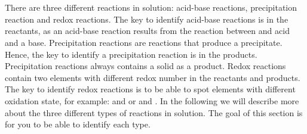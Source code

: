 \documentclass[main.tex]{subfiles}
\begin{document}
\section{\color{blue!30!black}{An introduction to reactions in solution}}
There are three different reactions in solution: acid-base reactions, precipitation reaction and redox reactions. The key to identify acid-base reactions is in the reactants, as an acid-base reaction results from the reaction between and acid and a base. Precipitation reactions are reactions that produce a precipitate. Hence, the key to identify a precipitation reaction is in the products. Precipitation reactions always contains a solid as a product. Redox reactions contain two elements with different redox number in the reactants and products. The key to identify redox reactions is to be able to spot elements with different oxidation state, for example:  and  or  and . In the following we will describe more about the three different types of reactions in solution. The goal of this section is for you to be able to identify each type.
\sloppy 
\end{document}
